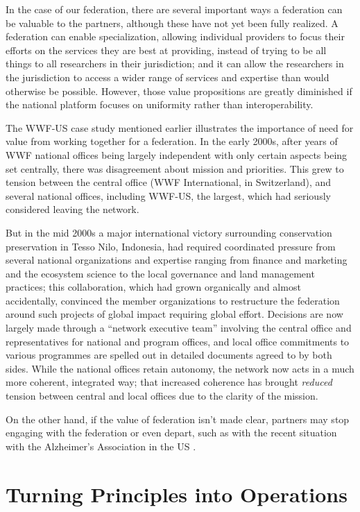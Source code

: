 \documentclass[11pt, letterpaper, twoside]{article}
\begin{document}
In the case of our federation, there are several important ways a
federation can be valuable to the partners, although these have not yet
been fully realized. A federation can enable specialization, allowing
individual providers to focus their efforts on the services they are
best at providing, instead of trying to be all things to all researchers
in their jurisdiction; and it can allow the researchers in the
jurisdiction to access a wider range of services and expertise than
would otherwise be possible. However, those value propositions are
greatly diminished if the national platform focuses on uniformity rather
than interoperability.

The WWF-US case study mentioned earlier illustrates the importance of
need for value from working together for a federation. In the early
2000s, after years of WWF national offices being largely independent
with only certain aspects being set centrally, there was disagreement
about mission and priorities. This grew to tension between the central
office (WWF International, in Switzerland), and several national
offices, including WWF-US, the largest, which had seriously considered
leaving the network.

But in the mid 2000s a major international victory surrounding
conservation preservation in Tesso Nilo, Indonesia, had required
coordinated pressure from several national organizations and expertise
ranging from finance and marketing and the ecosystem science to the
local governance and land management practices; this collaboration,
which had grown organically and almost accidentally, convinced the
member organizations to restructure the federation around such projects
of global impact requiring global effort. Decisions are now largely made
through a ``network executive team'' involving the central office and
representatives for national and program offices, and local office
commitments to various programmes are spelled out in detailed documents
agreed to by both sides. While the national offices retain autonomy, the
network now acts in a much more coherent, integrated way; that increased
coherence has brought \emph{reduced} tension between central and local
offices due to the clarity of the mission.

On the other hand, if the value of federation isn't made clear, partners
may stop engaging with the federation or even depart, such as with the
recent situation with the Alzheimer's Association in the US \citep{alzheimers}.

\section*{Turning Principles into Operations}
%
%
\end{document}

